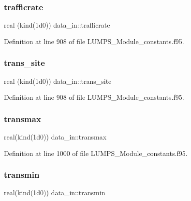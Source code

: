 \mbox{\label{namespacedata__in_aba0ff641b30b686cf5afdd358761c586}} 
\subsubsection{\texorpdfstring{trafficrate}{trafficrate}}
{\footnotesize\ttfamily real (kind(1d0)) data\+\_\+in\+::trafficrate}



Definition at line 908 of file L\+U\+M\+P\+S\+\_\+\+Module\+\_\+constants.\+f95.

\mbox{\label{namespacedata__in_a9c53dc9992f8f407198edbaea657599a}} 
\subsubsection{\texorpdfstring{trans\+\_\+site}{trans\_site}}
{\footnotesize\ttfamily real (kind(1d0)) data\+\_\+in\+::trans\+\_\+site}



Definition at line 908 of file L\+U\+M\+P\+S\+\_\+\+Module\+\_\+constants.\+f95.

\mbox{\label{namespacedata__in_a22d45e9410b8efdc18d68d246d3162ce}} 
\subsubsection{\texorpdfstring{transmax}{transmax}}
{\footnotesize\ttfamily real(kind(1d0)) data\+\_\+in\+::transmax}



Definition at line 1000 of file L\+U\+M\+P\+S\+\_\+\+Module\+\_\+constants.\+f95.

\mbox{\label{namespacedata__in_a41ecad1a8c8dc7524f1197ded67dd815}} 
\subsubsection{\texorpdfstring{transmin}{transmin}}
{\footnotesize\ttfamily real(kind(1d0)) data\+\_\+in\+::transmin}



